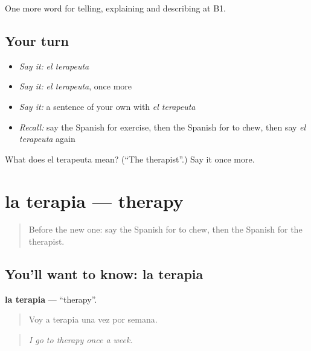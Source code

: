 \begin{grammarlens}[title={What you've built}]
One more word for telling, explaining and describing at B1.
\end{grammarlens}

\subsection*{Your turn}
\begin{itemize}
\raggedright
  \item \emph{Say it:} \emph{el terapeuta}
  \item \emph{Say it:} \emph{el terapeuta}, once more
  \item \emph{Say it:} a sentence of your own with \emph{el terapeuta}
  \item \emph{Recall:} say the Spanish for exercise, then the Spanish for to chew, then say \emph{el terapeuta} again
\end{itemize}

\begin{tcolorbox}[breakable,colback=teal!4,colframe=teal!35!black,title={Before you move on}]
What does el terapeuta mean? (\textquotedblleft{}The therapist\textquotedblright{}.) Say it once more.
\end{tcolorbox}
\section[la terapia]{la terapia — therapy}

\label{lesson:ES-C743-terapia}



\begin{quote}
Before the new one: say the Spanish for to chew, then the Spanish for the therapist.
\end{quote}

\subsection*{You'll want to know: la terapia}
\textbf{la terapia} — \textquotedblleft{}therapy\textquotedblright{}.

\begin{quote}
Voy a terapia una vez por semana.
\end{quote}

\begin{quote}
\emph{I go to therapy once a week.}
\end{quote}

